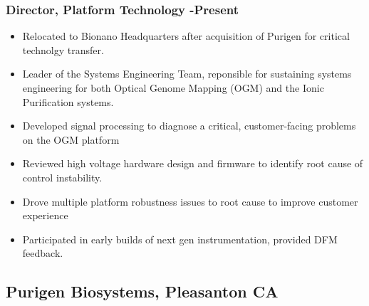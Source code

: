 \documentclass{res}
\begin{document}
\begin{resume}
   \subsubsection{Director, Platform Technology -Present}
    \begin{itemize}
     \item Relocated to Bionano Headquarters after acquisition of Purigen for critical technolgy transfer.
     \item Leader of the Systems Engineering Team, reponsible for sustaining systems engineering for both Optical Genome Mapping (OGM) and the Ionic Purification systems. 
     \item Developed signal processing to diagnose a critical, customer-facing problems on the OGM platform
     \item Reviewed high voltage hardware design and firmware to identify root cause of control instability.
     \item Drove multiple platform robustness issues to root cause to improve customer experience
     \item Participated in early builds of next gen instrumentation, provided DFM feedback.
    \end{itemize}


    \vspace{-0.2in}
   \subsection{Purigen Biosystems, Pleasanton CA}
    \vspace{-0.2in}


\end{resume}
\end{document}
